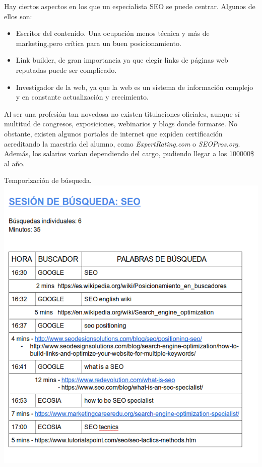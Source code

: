 	Hay ciertos aspectos en los que un especialista SEO se puede centrar. Algunos de ellos son:
	
	\begin{itemize}
		\item Escritor del contenido. Una ocupación menos técnica y más de marketing,pero crítica para un buen posicionamiento.
		\item Link builder, de gran importancia ya que elegir links de páginas web reputadas puede ser complicado.
		\item Investigador de la web, ya que la web es un sistema de información complejo y en constante actualización y crecimiento.
	\end{itemize}
	
	Al ser una profesión tan novedosa no existen titulaciones oficiales, aunque sí multitud de congresos, exposiciones, webinarios y blogs donde formarse. No obstante, existen algunos portales de internet que expiden certificación acreditando la maestría del alumno, como \textit{ExpertRating.com} o \textit{SEOPros.org}. Además, los salarios varían dependiendo del cargo, pudiendo llegar a los 100000\$ al año.
	
	\begin{subsection}{Temporizaci\'on de b\'usqueda.}
		\includegraphics[width=1.2\textwidth]{seo-session.png}
	\end{subsection}
	\newpage
	
